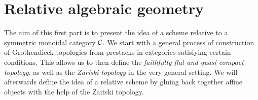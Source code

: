 
\section{Relative algebraic geometry} %
\label{sec:relative_algebraic_geometry}

\vspace{-2em}
\begin{translation}{2}{1}
    The aim of this first part is to present the idea of a scheme relative to a symmetric monoidal category $\mathcal{C}$.
    We start with a general process of construction of Grothendieck topologies from prestacks in categories satisfying certain conditions.
    This allows us to then define the \emph{faithfully flat and quasi-compact topology}, as well as the \emph{Zariski topology} in the very general setting.
    We will afterwards define the idea of a relative scheme by gluing back together affine objects with the help of the Zariski topology.
\end{translation}
\vspace{-2em}











